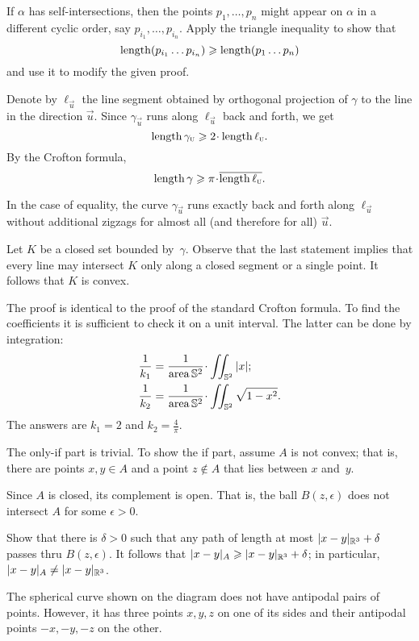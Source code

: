 \begin{multicols}{2}
If $\alpha$ has self-intersections, then the points $p_1,\dots, p_n$ might appear on $\alpha$ in a different cyclic order, say $p_{i_1},\dots,p_{i_n}$.
Apply the triangle inequality to show that 
\[\mathop{\rm length}\nolimits(p_{i_1}\dots p_{i_n})\geqslant \mathop{\rm length}\nolimits (p_1\dots p_n)\]
and use it to modify the given proof.



Denote by $\ell_{\vec u}$ the line segment 
obtained by orthogonal projection of $\gamma$ to the line in the direction ${\vec u}$.
Since $\gamma_{\vec u}$ runs along $\ell_{\vec u}$ back and forth, we get 
\[\length\gamma_{\vec u}\ge 2\cdot\length\ell_{\vec u}.\]
By the Crofton formula, 
\[\length\gamma\ge \pi\cdot \overline{\length\ell_{\vec u}}.\]

In the case of equality, the curve $\gamma_{\vec u}$ runs exactly back and forth along $\ell_{\vec u}$ without additional zigzags for almost all (and therefore for all) ${\vec u}$.

Let $K$ be a closed set bounded by~$\gamma$.
Observe that the last statement implies that every line may intersect $K$ only along a closed segment or a single point.
It follows that $K$ is convex.

The proof is identical to the proof of the standard Crofton formula.
To find the coefficients it is sufficient to check it on a unit interval.
The latter can be done by integration:
\begin{align*}
\frac1{k_1}&=\frac{1}{\area \mathbb{S}^2}\cdot\iint_{\mathbb{S}^2} |x|;
\\
\frac1{k_2}&=\frac{1}{\area \mathbb{S}^2}\cdot\iint_{\mathbb{S}^2} \sqrt{1-x^2}.
\end{align*}
The answers are $k_1=2$ and $k_2=\tfrac4\pi$.

The only-if part is trivial.
To show the if part, assume $A$ is not convex;
that is, there are points $x,y\in A$ and a point $z\notin A$ that lies between $x$ and~$y$.

Since $A$ is closed, its complement is open.
That is, the ball $B(z,\epsilon)$ does not intersect $A$ for some $\epsilon>0$.

Show that there is $\delta>0$ such that any path of length at most $\dist{x}{y}{\mathbb{R}^3}+\delta$ passes thru $B(z,\epsilon)$.
It follows that $\dist{x}{y}A\ge \dist{x}{y}{\mathbb{R}^3}+\delta$; 
in particular, $\dist{x}{y}A\ne \dist{x}{y}{\mathbb{R}^3}$.

The spherical curve shown on the diagram does not have antipodal pairs of points.
However, it has three points $x,y,z$ on one of its sides and their antipodal points $-x,-y,-z$ on the other.


\end{multicols}
